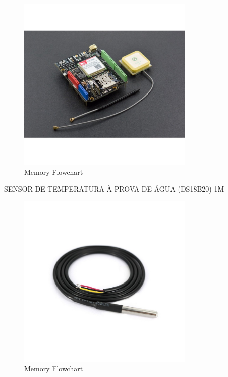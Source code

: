 \begin{figure}[H]
    \centering
    \includegraphics[width=0.75\textwidth]{images/chapter/design/components/SIM7000.png}  %
    \caption{Memory Flowchart}
    \label{fig:Memory Flowchart}        
\end{figure}

SENSOR DE TEMPERATURA À PROVA DE ÁGUA (DS18B20) 1M


\begin{figure}[H]
    \centering
    \includegraphics[width=0.75\textwidth]{images/chapter/design/components/temp.png}  %
    \caption{Memory Flowchart}
    \label{fig:Memory Flowchart}        
\end{figure}

